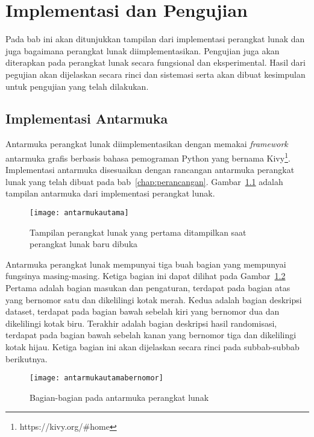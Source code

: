 \chapter{Implementasi dan Pengujian}
\label{chap:Implementasi}

Pada bab ini akan ditunjukkan tampilan dari implementasi perangkat lunak dan juga bagaimana perangkat lunak diimplementasikan. Pengujian juga akan diterapkan pada perangkat lunak secara fungsional dan eksperimental. Hasil dari pegujian akan dijelaskan secara rinci dan sistemasi serta akan dibuat kesimpulan untuk pengujian yang telah dilakukan.

\section{Implementasi Antarmuka}
\label{sec:implementasi-antarmuka}

Antarmuka perangkat lunak diimplementasikan dengan memakai \textit{framework} antarmuka grafis berbasis bahasa pemograman Python yang bernama Kivy\footnote{https://kivy.org/\#home}. Implementasi antarmuka disesuaikan dengan rancangan antarmuka perangkat lunak yang telah dibuat pada bab~\ref{chap:perancangan}. Gambar~\ref{fig:antarmukautama} adalah tampilan antarmuka dari implementasi perangkat lunak.

\begin{figure}
	\centering
	\texttt{[image: antarmukautama]}
	\caption{Tampilan perangkat lunak yang pertama ditampilkan saat perangkat lunak baru dibuka}
	\label{fig:antarmukautama}
\end{figure}

Antarmuka perangkat lunak mempunyai tiga buah bagian yang mempunyai fungsinya masing-masing. Ketiga bagian ini dapat dilihat pada Gambar~\ref{fig:antarmukautamabernomor} Pertama adalah bagian masukan dan pengaturan, terdapat pada bagian atas yang bernomor satu dan dikelilingi kotak merah. Kedua adalah bagian deskripsi dataset, terdapat pada bagian bawah sebelah kiri yang bernomor dua dan dikelilingi kotak biru. Terakhir adalah bagian deskripsi hasil randomisasi, terdapat pada bagian bawah sebelah kanan yang bernomor tiga dan dikelilingi kotak hijau. Ketiga bagian ini akan dijelaskan secara rinci pada subbab-subbab berikutnya.

\begin{figure}
	\centering
	\texttt{[image: antarmukautamabernomor]}
	\caption{Bagian-bagian pada antarmuka perangkat lunak}
	\label{fig:antarmukautamabernomor}
\end{figure}

